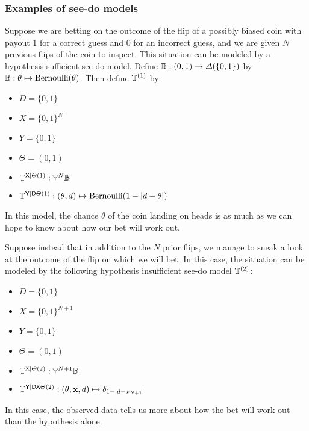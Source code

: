 \subsubsection{Examples of see-do models}

Suppose we are betting on the outcome of the flip of a possibly biased coin with payout 1 for a correct guess and 0 for an incorrect guess, and we are given $N$ previous flips of the coin to inspect. This situation can be modeled by a hypothesis sufficient see-do model. Define $\mathbb{B}:(0,1)\to \Delta(\{0,1\})$ by $\mathbb{B}:\theta\mapsto \mathrm{Bernoulli}(\theta)$. Then define $\mathbb{T}^{(1)}$ by:

\begin{itemize}
    \item $D=\{0,1\}$
    \item $X=\{0,1\}^N$
    \item $Y=\{0,1\}$
    \item $\Theta=(0,1)$
    \item $\kernel{T}^{\RV{X}|\Theta(1)}:\splitter{0.1}^N\kernel{B}$
    \item $\mathbb{T}^{\mathsf{Y}|\mathsf{D}\Theta(1)}:(\theta,d)\mapsto \mathrm{Bernoulli}(1-|d-\theta|)$
\end{itemize}

In this model, the chance $\theta$ of the coin landing on heads is as much as we can hope to know about how our bet will work out.

Suppose instead that in addition to the $N$ prior flips, we manage to sneak a look at the outcome of the flip on which we will bet. In this case, the situation can be modeled by the following hypothesis insufficient see-do model $\mathbb{T}^{(2)}$:

\begin{itemize}
    \item $D=\{0,1\}$
    \item $X=\{0,1\}^{N+1}$
    \item $Y=\{0,1\}$
    \item $\Theta=(0,1)$
    \item $\kernel{T}^{\RV{X}|\Theta (2)}:\splitter{0.1}^{N+1}\kernel{B}$
    \item $\mathbb{T}^{\mathsf{Y}|\mathsf{D}\mathsf{X}\Theta(2)}:(\theta,\mathbf{x},d)\mapsto \delta_{1-|d-x_{N+1}|}$
\end{itemize}

In this case, the observed data tells us more about how the bet will work out than the hypothesis alone.

